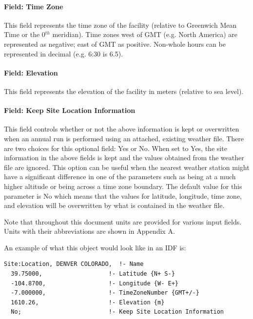\paragraph{Field: Time Zone}\label{field-time-zone}

This field represents the time zone of the facility (relative to Greenwich Mean Time or the 0\(^{th}\) meridian). Time zones west of GMT (e.g. North America) are represented as negative; east of GMT as positive. Non-whole hours can be represented in decimal (e.g. 6:30 is 6.5).

\paragraph{Field: Elevation}\label{field-elevation}

This field represents the elevation of the facility in meters (relative to sea level).

\paragraph{Field: Keep Site Location Information}\label{keep-site-location-information}

This field controls whether or not the above information is kept or overwritten when an annual run is performed using an attached, existing weather file.  There are two choices for this optional field: Yes or No.  When set to Yes, the site information in the above fields is kept and the values obtained from the weather file are ignored.  This option can be useful when the nearest weather station might have a significant difference in one of the parameters such as being at a much higher altitude or being across a time zone boundary.  The default value for this parameter is No which means that the values for latitude, longitude, time zone, and elevation will be overwritten by what is contained in the weather file.

\begin{callout}
Note that throughout this document units are provided for various input fields.  Units with their abbreviations are shown in Appendix A.
\end{callout}

An example of what this object would look like in an IDF is:

\begin{lstlisting}
Site:Location, DENVER COLORADO,  !- Name
  39.75000,                   !- Latitude {N+ S-}
  -104.8700,                  !- Longitude {W- E+}
  -7.000000,                  !- TimeZoneNumber {GMT+/-}
  1610.26,                    !- Elevation {m}
  No;                         !- Keep Site Location Information
\end{lstlisting}

